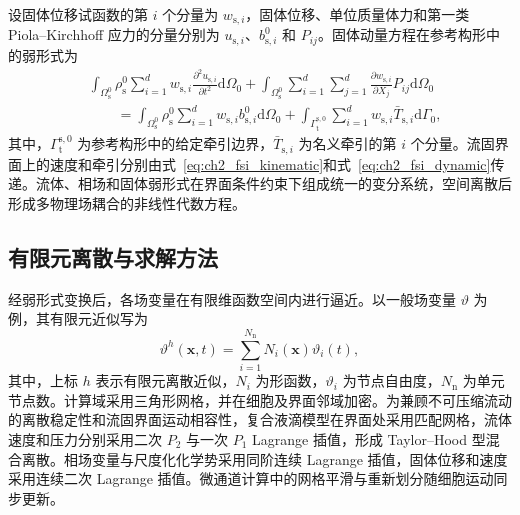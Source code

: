 设固体位移试函数的第 $i$ 个分量为 $w_{\mathrm s,i}$，固体位移、单位质量体力和第一类 Piola--Kirchhoff 应力的分量分别为 $u_{\mathrm s,i}$、$b_{\mathrm s,i}^0$ 和 $P_{ij}$。固体动量方程在参考构形中的弱形式为
\begin{equation}
\begin{aligned}
&\int_{\Omega_{\mathrm s}^0}
\rho_{\mathrm s}^0
\sum_{i=1}^{d}w_{\mathrm s,i}
\frac{\partial^2u_{\mathrm s,i}}{\partial t^2}
\mathrm d\Omega_0
+
\int_{\Omega_{\mathrm s}^0}
\sum_{i=1}^{d}\sum_{j=1}^{d}
\frac{\partial w_{\mathrm s,i}}{\partial X_j}
P_{ij}
\mathrm d\Omega_0
\\
&\qquad
=
\int_{\Omega_{\mathrm s}^0}
\rho_{\mathrm s}^0
\sum_{i=1}^{d}w_{\mathrm s,i}b_{\mathrm s,i}^0
\mathrm d\Omega_0
+
\int_{\Gamma_{\mathrm t}^{\mathrm s,0}}
\sum_{i=1}^{d}w_{\mathrm s,i}\bar T_{\mathrm s,i}
\mathrm d\Gamma_0,
\end{aligned}
\label{eq:ch2_weak_solid}
\end{equation}
其中，$\Gamma_{\mathrm t}^{\mathrm s,0}$ 为参考构形中的给定牵引边界，$\bar T_{\mathrm s,i}$ 为名义牵引的第 $i$ 个分量。流固界面上的速度和牵引分别由式~\eqref{eq:ch2_fsi_kinematic}和式~\eqref{eq:ch2_fsi_dynamic}传递。流体、相场和固体弱形式在界面条件约束下组成统一的变分系统，空间离散后形成多物理场耦合的非线性代数方程。

\subsection{有限元离散与求解方法}
\label{subsec:ch2_discretization}

经弱形式变换后，各场变量在有限维函数空间内进行逼近。以一般场变量 $\vartheta$ 为例，其有限元近似写为
\begin{equation}
\vartheta^h(\boldsymbol{x},t)
=
\sum_{i=1}^{N_{\mathrm n}}
N_i(\boldsymbol{x})\vartheta_i(t),
\label{eq:ch2_fe_interpolation}
\end{equation}
其中，上标 $h$ 表示有限元离散近似，$N_i$ 为形函数，$\vartheta_i$ 为节点自由度，$N_{\mathrm n}$ 为单元节点数。计算域采用三角形网格，并在细胞及界面邻域加密。为兼顾不可压缩流动的离散稳定性和流固界面运动相容性，复合液滴模型在界面处采用匹配网格，流体速度和压力分别采用二次 $P_2$ 与一次 $P_1$ Lagrange 插值，形成 Taylor--Hood 型混合离散\cite{taylor1973numerical}。相场变量与尺度化化学势采用同阶连续 Lagrange 插值，固体位移和速度采用连续二次 Lagrange 插值。微通道计算中的网格平滑与重新划分随细胞运动同步更新。

